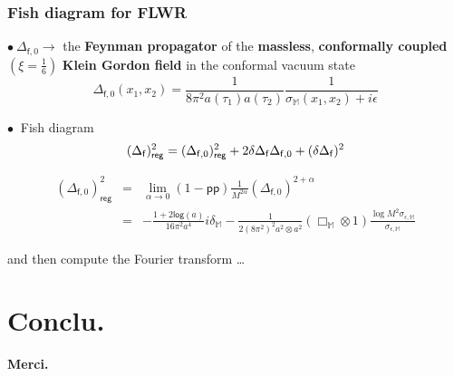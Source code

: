 \documentclass[9pt]{beamer}
\newcommand{\logar}{\mathsf{log}} %
\newcommand{\pp}{\mathsf{pp}} %
\newcommand{\Mbb}{\mathbb{M}}
\newcommand{\fsf}{\mathsf{f}}
\begin{document}
\begin{frame}

\frametitle{Fish diagram for FLWR} 

$\bullet \ \Delta_{\fsf,0} \to$ the \textbf{Feynman propagator} of the \textbf{massless}, \textbf{conformally coupled} $(\xi = \frac16)$ \textbf{Klein Gordon field} in the conformal vacuum state 
\begin{equation*}
\Delta_{\fsf,0}(x_1,x_2)=\frac{1}{8\pi^2 a(\tau_1)a(\tau_2)}\frac{1}{\sigma_{\Mbb}(x_1,x_2)+i\epsilon} 
\end{equation*}

$\bullet \ $ Fish diagram
\vspace*{-12pt}
\begin{equation*}
(\Delta_\fsf)^2_\mathsf{reg} = (\Delta_{\fsf,0})^2_\mathsf{reg} + 2 \delta\Delta_\fsf \Delta_{\fsf,0} + (\delta\Delta_\fsf)^2
\vspace*{-25pt}
\end{equation*}

\begin{eqnarray*}
(\Delta_{\fsf,0})^2_\mathsf{reg} &=& 
\lim_{\alpha\to 0} \left( 1 - \pp \right) \frac{1}{M^{2\alpha}} (\Delta_{\fsf,0})^{2+\alpha} \\
&=& - \frac{1+2\logar(a)}{16\pi^2 a^4} i\delta_\Mbb-\frac{1}{2(8\pi^2)^2 a^2\otimes a^2} \left(\Box_{\Mbb}\otimes 1\right)\frac{\log{M^2\sigma_{\epsilon,\Mbb}}}{\sigma_{\epsilon,\Mbb}}
\end{eqnarray*}

and then compute the Fourier transform \dots

\end{frame}

\section{Conclu.}

{%
\begin{frame}
\vfill
\begin{flushright}
\textcolor{white!80!blue}{\bf \LARGE Merci.}
\end{flushright}
\end{frame}
}%
\end{document}
